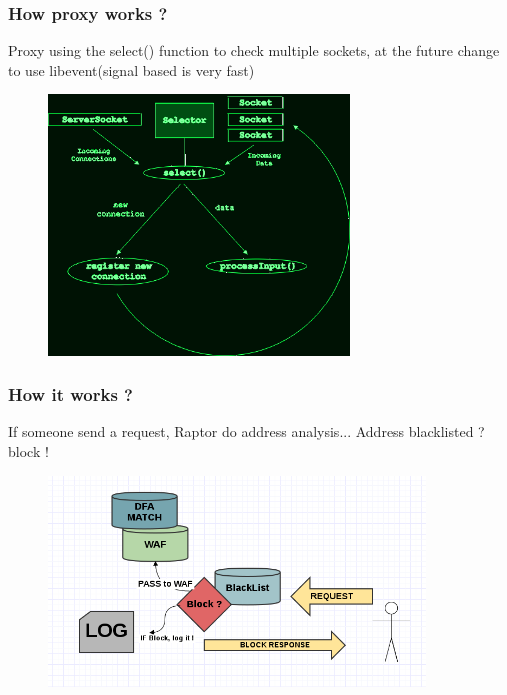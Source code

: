 \documentclass[serif,mathserif]{beamer}
\begin{document}
\begin{frame}
  \frametitle{How proxy works ?}
  Proxy using the select() function to check multiple sockets, at the future change to use libevent(signal based is very fast)  
  \begin{itemize} 
  \begin{figure}[]    
    \centering
    \includegraphics[width=8cm]{images/select.png} 
  \end{figure}
  \end{itemize}
\end{frame}


\begin{frame}
  \frametitle{How it works ?}
  If someone send a request, Raptor do address analysis... Address blacklisted ? block !
  \begin{itemize} 
  \begin{figure}[]    
    \centering
    \includegraphics[width=10cm]{images/blockip.png} 
  \end{figure}
  \end{itemize}
\end{frame}
\end{document}
